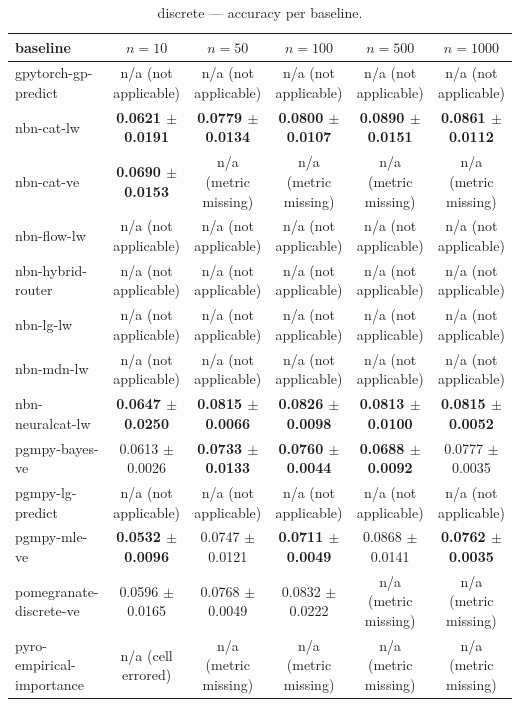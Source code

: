 \begin{table}[h]
\centering
\caption{discrete — accuracy per baseline.}
\label{tab:discrete_accuracy}
\begin{tabular}{lccccc}
\toprule
baseline & $n=10$ & $n=50$ & $n=100$ & $n=500$ & $n=1000$ \\
\midrule
gpytorch-gp-predict & n/a (not applicable) & n/a (not applicable) & n/a (not applicable) & n/a (not applicable) & n/a (not applicable) \\
nbn-cat-lw & \textbf{0.0621 $\pm$ 0.0191} & \textbf{0.0779 $\pm$ 0.0134} & \textbf{0.0800 $\pm$ 0.0107} & \textbf{0.0890 $\pm$ 0.0151} & \textbf{0.0861 $\pm$ 0.0112} \\
nbn-cat-ve & \textbf{0.0690 $\pm$ 0.0153} & n/a (metric missing) & n/a (metric missing) & n/a (metric missing) & n/a (metric missing) \\
nbn-flow-lw & n/a (not applicable) & n/a (not applicable) & n/a (not applicable) & n/a (not applicable) & n/a (not applicable) \\
nbn-hybrid-router & n/a (not applicable) & n/a (not applicable) & n/a (not applicable) & n/a (not applicable) & n/a (not applicable) \\
nbn-lg-lw & n/a (not applicable) & n/a (not applicable) & n/a (not applicable) & n/a (not applicable) & n/a (not applicable) \\
nbn-mdn-lw & n/a (not applicable) & n/a (not applicable) & n/a (not applicable) & n/a (not applicable) & n/a (not applicable) \\
nbn-neuralcat-lw & \textbf{0.0647 $\pm$ 0.0250} & \textbf{0.0815 $\pm$ 0.0066} & \textbf{0.0826 $\pm$ 0.0098} & \textbf{0.0813 $\pm$ 0.0100} & \textbf{0.0815 $\pm$ 0.0052} \\
pgmpy-bayes-ve & 0.0613 $\pm$ 0.0026 & \textbf{0.0733 $\pm$ 0.0133} & \textbf{0.0760 $\pm$ 0.0044} & \textbf{0.0688 $\pm$ 0.0092} & 0.0777 $\pm$ 0.0035 \\
pgmpy-lg-predict & n/a (not applicable) & n/a (not applicable) & n/a (not applicable) & n/a (not applicable) & n/a (not applicable) \\
pgmpy-mle-ve & \textbf{0.0532 $\pm$ 0.0096} & 0.0747 $\pm$ 0.0121 & \textbf{0.0711 $\pm$ 0.0049} & 0.0868 $\pm$ 0.0141 & \textbf{0.0762 $\pm$ 0.0035} \\
pomegranate-discrete-ve & 0.0596 $\pm$ 0.0165 & 0.0768 $\pm$ 0.0049 & 0.0832 $\pm$ 0.0222 & n/a (metric missing) & n/a (metric missing) \\
pyro-empirical-importance & n/a (cell errored) & n/a (metric missing) & n/a (metric missing) & n/a (metric missing) & n/a (metric missing) \\
\bottomrule
\end{tabular}
\end{table}

